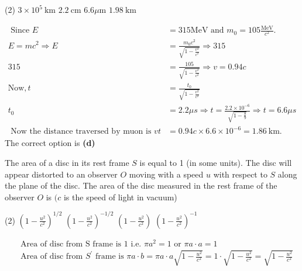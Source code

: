 \begin{enumerate}
\begin{minipage}{\textwidth}
\end{minipage}
\begin{tasks}(2)
	\task[\textbf{A.}] $3 \times 10^{5} \mathrm{~km}$ 
	\task[\textbf{B.}]$2.2 \mathrm{~cm}$
	\task[\textbf{C.}]$6.6 \mu \mathrm{m}$
	\task[\textbf{D.}]$1.98 \mathrm{~km}$
\end{tasks}
\begin{answer}
	\begin{align*}
	\text { Since } E&=315 \mathrm{MeV} \text { and } m_{0}=105 \frac{\mathrm{MeV}}{c^{2}} \text {. }\\
	E=m c^{2} \Rightarrow E&=\frac{m_{0} c^{2}}{\sqrt{1-\frac{v^{2}}{c^{2}}}} \Rightarrow 315	\\
	315&=\frac{105}{\sqrt{1-\frac{v^{2}}{c^{2}}}} \Rightarrow v=0.94 c\\
	\text{Now}, t&=\frac{t_{0}}{\sqrt{1-\frac{v^{2}}{c^{2}}}}\\
	t_{0}&=2.2 \mu s \Rightarrow t=\frac{2.2 \times 10^{-6}}{\sqrt{1-\frac{8}{9}}} \Rightarrow t=6.6 \mu s\\
	\text { Now the distance traversed by muon is } v t&=0.94 c \times 6.6 \times 10^{-6}=1.86 \mathrm{~km} \text {. }
	\end{align*}
	The correct option is \textbf{(d)}
\end{answer}
\begin{minipage}{\textwidth}
	\item The area of a disc in its rest frame $S$ is equal to 1 (in some units). The disc will appear distorted to an observer $O$ moving with a speed $u$ with respect to $S$ along the plane of the disc. The area of the disc measured in the rest frame of the observer $O$ is $(c$ is the speed of light in vacuum)
\end{minipage}
\begin{tasks}(2)
	\task[\textbf{A.}] $\left(1-\frac{u^{2}}{c^{2}}\right)^{1 / 2}$
	\task[\textbf{B.}]$\left(1-\frac{u^{2}}{c^{2}}\right)^{-1 / 2}$
	\task[\textbf{C.}]$\left(1-\frac{u^{2}}{c^{2}}\right)$
	\task[\textbf{D.}]$\left(1-\frac{u^{2}}{c^{2}}\right)^{-1}$
\end{tasks}
\begin{answer}
\begin{align*}
&\text { Area of disc from } \mathrm{S} \text { frame is } 1 \text { i.e. } \pi a^{2}=1 \text { or } \pi a \cdot a=1\\
&\text { Area of disc from } S^{\prime} \text { frame is } \pi a \cdot b=\pi a \cdot a \sqrt{1-\frac{u^{2}}{c^{2}}}=1 \cdot \sqrt{1-\frac{u^{2}}{c^{2}}}=\sqrt{1-\frac{u^{2}}{c^{2}}}\\

\end{align*}
\end{answer}
\end{enumerate}
